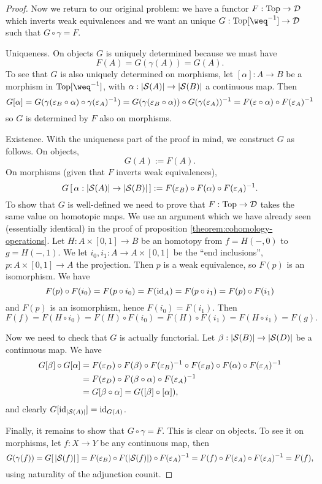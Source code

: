 \begin{proof}
Now we return to our original problem: we have a functor $F:\Top\to\Dd$ which inverts weak equivalences and we want an unique $G:\Top[\weq^\inv]\to\Dd$ such that $G\circ\gamma=F$.

Uniqueness. On objects $G$ is uniquely determined because we must have
\[F(A)=G(\gamma(A))=G(A).\]
To see that $G$ is also uniquely determined on morphisms, let $[\alpha]:A\to B$ be a morphism in $\Top[\weq^\inv]$, with $\alpha:|\S(A)|\to|\S(B)|$ a continuous map. Then
\[G[\alpha]=G(\gamma(\epsilon_B\circ\alpha)\circ\gamma(\epsilon_A)^\inv)=G(\gamma(\epsilon_B\circ\alpha))\circ G(\gamma(\epsilon_A))^\inv=F(\epsilon\circ\alpha)\circ F(\epsilon_A)^\inv\]
so $G$ is determined by $F$ also on morphisms.

Existence. With the uniqueness part of the proof in mind, we construct $G$ as follows. On objects,
\[G(A):=F(A).\]
On morphisms (given that $F$ inverts weak equivalences),
\[G\,[\,\alpha:|\S(A)|\to|\S(B)|{\,}]:=F(\epsilon_B)\circ F(\alpha)\circ F(\epsilon_A)^\inv.\]
To show that $G$ is well-defined we need to prove that $F:\Top\to\Dd$ takes the same value on homotopic maps. We use an argument which we have already seen (essentially identical) in the proof of proposition \ref{theorem:cohomology-operations}. Let $H:A\times[0,1]\to B$ be an homotopy from $f=H(-,0)$ to $g=H(-,1)$. We let $i_0,i_1:A\to A\times[0,1]$ be the \enquote{end inclusions}, $p:A\times[0,1]\to A$ the projection. Then $p$ is a weak equivalence, so $F(p)$ is an isomorphism. We have
\[F(p)\circ F(i_0)=F(p\circ i_0)=F(\id_A)=F(p\circ i_1)=F(p)\circ F(i_1)\]
and $F(p)$ is an isomorphism, hence $F(i_0)=F(i_1)$. Then
\[F(f)=F(H\circ i_0)=F(H)\circ F(i_0)=F(H)\circ F(i_1)=F(H\circ i_1)=F(g).\]

Now we need to check that $G$ is actually functorial. Let $\beta:|\S(B)|\to|\S(D)|$ be a continuous map. We have
\begin{align*}
    G[\beta]\circ G[\alpha]&=F(\epsilon_D)\circ F(\beta)\circ F(\epsilon_B)^\inv\circ F(\epsilon_B)\circ F(\alpha)\circ F(\epsilon_A)^\inv\\
    &=F(\epsilon_D)\circ F(\beta\circ\alpha)\circ F(\epsilon_A)^\inv\\
    &=G[\beta\circ\alpha]=G([\beta]\circ[\alpha]),
\end{align*}
and clearly $G[\id_{|\S(A)|}]=\id_{G(A)}$.

Finally, it remains to show that $G\circ\gamma=F$. This is clear on objects. To see it on morphisms, let $f:X\to Y$ be any continuous map, then
\[G(\gamma(f))=G[\,|\S(f)|{\,}]=F(\epsilon_B)\circ F(|\S(f)|)\circ F(\epsilon_A)^\inv=F(f)\circ F(\epsilon_A)\circ F(\epsilon_A)^\inv=F(f),\]
using naturality of the adjunction counit.
\end{proof}
